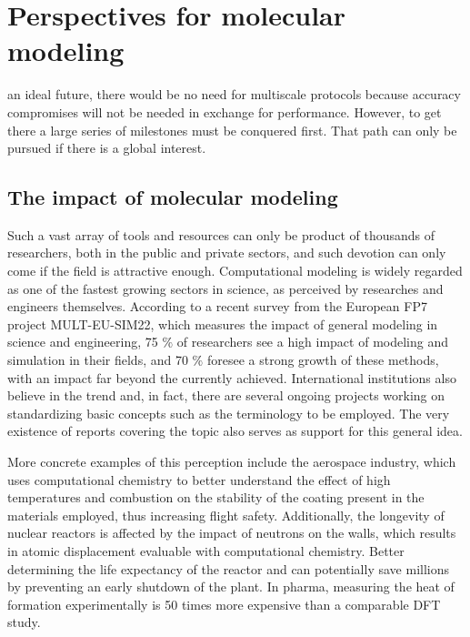\chapter{Perspectives for molecular modeling}
\label{chap:appendix-a}

 an ideal future, there would be no need for multiscale protocols because accuracy compromises will not be needed in exchange for performance. However, to get there a large series of milestones must be conquered first. That path can only be pursued if there is a global interest.

\section{The impact of molecular modeling}
\label{molecular-modeling-impact}

Such a vast array of tools and resources can only be product of thousands of researchers, both in the public and private sectors, and such devotion can only come if the field is attractive enough. Computational modeling is widely regarded as one of the fastest growing sectors in science, as perceived by researches and engineers themselves. According to a recent survey from the European FP7 project MULT-EU-SIM22, which measures the impact of general modeling in science and engineering, 75 $\%$  of researchers see a high impact of modeling and simulation in their fields, and 70 $\%$  foresee a strong growth of these methods, with an impact far beyond the currently achieved.\cite{ENN2012} International institutions also believe in the trend and, in fact, there are several ongoing projects working on standardizing basic concepts such as the terminology to be employed.\cite{cen2017} The very existence of reports covering the topic\cite{Goldbeck2012,Goldbeck2016,goldbeck2017} also serves as support for this general idea.

More concrete examples of this perception include the aerospace industry, which uses computational chemistry to better understand the effect of high temperatures and combustion on the stability of the coating present in the materials employed, thus increasing flight safety. Additionally, the longevity of nuclear reactors is affected by the impact of neutrons on the walls, which results in atomic displacement evaluable with computational chemistry. Better determining the life expectancy of the reactor and can potentially save millions by preventing an early shutdown of the plant.\cite{UKeconomics} In pharma, measuring the heat of formation experimentally is 50 times more expensive than a comparable DFT study.\cite{maginn2009}

